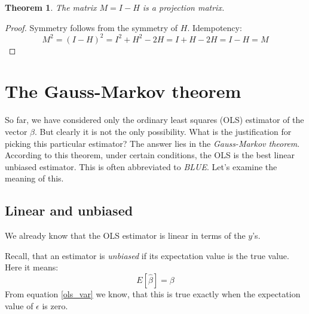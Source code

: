 \documentclass[12pt, a4paper]{article}
\newtheorem{theorem}{Theorem}[section]
\numberwithin{equation}{section}
\begin{document}
\begin{theorem}
The matrix $M=I-H$ is a projection matrix.
\end{theorem}
\begin{proof}
Symmetry follows from the symmetry of $H$. Idempotency:
\begin{equation}
M^2=(I-H)^2=I^2+H^2-2H=I+H-2H=I-H=M
\end{equation}
\end{proof}

\section{The Gauss-Markov theorem}
So far, we have considered only the ordinary least squares (OLS) estimator of the vector $\beta$. But clearly it is not the only possibility. What is the justification for picking this particular estimator? The answer lies in the \textit{Gauss-Markov theorem}. According to this theorem, under certain conditions, the OLS is the best linear unbiased estimator. This is often abbreviated to \textit{BLUE}. Let's examine the meaning of this.

\subsection{Linear and unbiased}
We already know that the OLS estimator is linear in terms of the $y$'s.

Recall, that an estimator is \textit{unbiased} if its expectation value is the true value. Here it means:
\begin{equation}
E[\hat{\beta}]=\beta
\end{equation}
From equation \ref{ols_var} we know, that this is true exactly when the expectation value of $\epsilon$ is zero.
\end{document}
